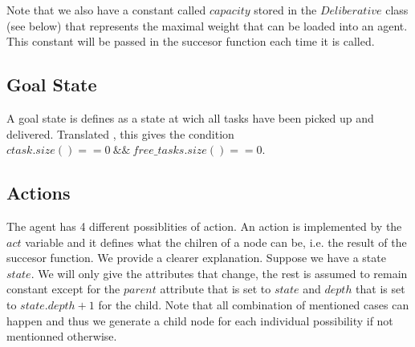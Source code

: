 \documentclass[11pt]{article}
\begin{document}
Note that we also have a constant called $capacity$ stored in the $Deliberative$ class (see below) that represents the maximal weight that can be loaded into an agent. This constant will be passed in the succesor function each time it is called.

\subsection{Goal State}
A goal state is defines as a state at wich all tasks have been picked up and delivered. Translated , this gives the condition $ctask.size() == 0\ \&\&\ free\_tasks.size() == 0$. 

\subsection{Actions}
The agent has 4 different possiblities of action. An action is implemented by the $act$ variable and it defines what the chilren of a node can be, i.e. the result of the succesor function. We provide a clearer explanation. Suppose we have a state $state$. We will only give the attributes that change, the rest is assumed to remain constant except for the $parent$ attribute that is set to $state$ and $depth$ that is set to $state.depth+1$ for the child. Note that all combination of mentioned cases can happen and thus we generate a child node for each individual possibility if not mentionned otherwise.
\end{document}
